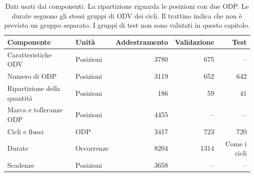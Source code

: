 \begin{table}[htbp]
\centering
\small
\begin{tabular}{@{}llrrr@{}}
\toprule
\textbf{Componente} & \textbf{Unità} & \textbf{Addestramento} & \textbf{Validazione} & \textbf{Test}\\
\midrule
Caratteristiche ODV & Posizioni & \num{3780} & 675 & --\\
Numero di ODP & Posizioni & \num{3119} & 652 & 642\\
Ripartizione della quantità & Posizioni & 186 & 59 & 41\\
Marca e tolleranze ODP & Posizioni & \num{4455} & -- & --\\
Cicli e flussi & ODP & \num{3417} & 723 & 720\\
Durate & Occorrenze & \num{8204} & \num{1314} & Come i cicli\\
Scadenze & Posizioni & \num{3658} & -- & --\\
\bottomrule
\end{tabular}
\caption{Dati usati dai componenti. La ripartizione riguarda le posizioni con due ODP. Le durate seguono gli stessi gruppi di ODV dei cicli. Il trattino indica che non è previsto un gruppo separato. I gruppi di test non sono valutati in questo capitolo.}
\label{tab:generation-data-splits}
\end{table}
